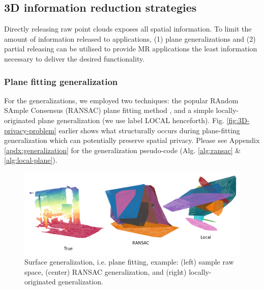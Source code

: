 
\subsection{3D information reduction strategies}\label{subsec:strategies}

%
Directly releasing raw point clouds exposes all spatial information. To limit the amount of information released to applications, (1) plane generalizations and (2) partial releasing can be utilised to provide MR applications the least information necessary to deliver the desired functionality. 

\subsubsection{Plane fitting generalization}\label{subsubsec:generalization}

For the generalizations, we employed two techniques: the popular RAndom SAmple Consensus (RANSAC) plane fitting method \cite{fischler1981random}, and a simple locally-originated plane generalization (we use label LOCAL henceforth). Fig. \ref{fig:3D-privacy-problem} earlier shows what structurally occurs during plane-fitting generalization which can potentially preserve spatial privacy. Please see Appendix \ref{apdx:generalization} for the generalization pseudo-code (Alg. \ref{alg:ransac} \& \ref{alg:local-plane}). 

\begin{figure}[t!]
	\centering
	\vspace{-2mm}
	\includegraphics[width = \columnwidth]{figures/generalization_sample-8}
	\caption{Surface generalization, i.e. plane fitting, example: \small{(left) sample raw space, (center) RANSAC generalization, and (right) locally-originated generalization.}}
	\label{fig:generalization-example}
\end{figure}

